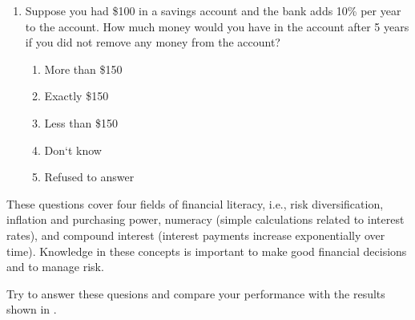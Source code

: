 {\begin{enumerate}
		\begin{enumerate}
			\item
			More
			\item
			The same
			\item
			Don`t know
			\item
			Refused to answer
		\end{enumerate}
		\item
		Suppose you had \$100 in a savings account and the bank adds 10\% per year to the account. How much money would you have in the account after 5 years if you did not remove any money from the account?
		
		\begin{enumerate}
			\item
			More than \$150
			\item
			Exactly \$150
			\item
			Less than \$150
			\item
			Don`t know
			\item
			Refused to answer
		\end{enumerate}
	\end{enumerate}
	
	These questions cover four fields of financial literacy, i.e., risk diversification, inflation and purchasing power, numeracy (simple calculations related to interest rates), and compound interest (interest payments increase exponentially over time). Knowledge in these concepts is important to make good financial decisions and to manage risk.
	
	Try to answer these quesions and compare your performance with the results shown in \citet{Klapper2020Financial}.
	
}

